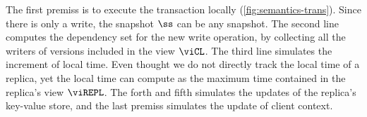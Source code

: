 \begin{mathpar}
\end{mathpar}

The first premiss is to execute the transaction locally (\cref{fig:semantics-trans}).
Since there is only a write, the snapshot \( \ss \) can be any snapshot.
The second line computes the dependency set for the new write operation,
by collecting all the writers of versions included in the view \( \viCL \).
The third line simulates the increment of local time.
Even thought we do not directly track the local time of a replica, 
yet the local time can compute as the maximum time contained in the replica's view \( \viREPL \).
The forth and fifth simulates the updates of the replica's key-value store,
and the last premiss simulates the update of client context.

